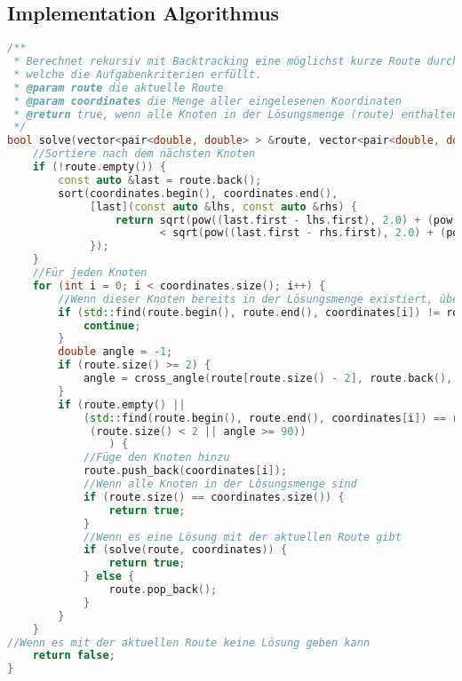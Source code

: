 \documentclass[a4paper,10pt,ngerman]{scrartcl}
\begin{document}
    \newpage
    \subsection{Implementation Algorithmus}\label{subsec:implementation-algorithmus}
    \begin{lstlisting}[frame=single,language=C++,title=Methode solve,breaklines=true,label={lst:code_solve}]
/**
 * Berechnet rekursiv mit Backtracking eine möglichst kurze Route durch den Graphen,
 * welche die Aufgabenkriterien erfüllt.
 * @param route die aktuelle Route
 * @param coordinates die Menge aller eingelesenen Koordinaten
 * @return true, wenn alle Knoten in der Lösungsmenge (route) enthalten sind, andernfalls false
 */
bool solve(vector<pair<double, double> > &route, vector<pair<double, double> > &coordinates) {
    //Sortiere nach dem nächsten Knoten
    if (!route.empty()) {
        const auto &last = route.back();
        sort(coordinates.begin(), coordinates.end(),
             [last](const auto &lhs, const auto &rhs) {
                 return sqrt(pow((last.first - lhs.first), 2.0) + (pow((last.second - lhs.second), 2.0)))
                        < sqrt(pow((last.first - rhs.first), 2.0) + (pow((last.second - rhs.second), 2.0)));
             });
    }
    //Für jeden Knoten
    for (int i = 0; i < coordinates.size(); i++) {
        //Wenn dieser Knoten bereits in der Lösungsmenge existiert, überspringe diesen
        if (std::find(route.begin(), route.end(), coordinates[i]) != route.end()) {
            continue;
        }
        double angle = -1;
        if (route.size() >= 2) {
            angle = cross_angle(route[route.size() - 2], route.back(), coordinates[i]);
        }
        if (route.empty() ||
            (std::find(route.begin(), route.end(), coordinates[i]) == route.end() &&
             (route.size() < 2 || angle >= 90))
                ) {
            //Füge den Knoten hinzu
            route.push_back(coordinates[i]);
            //Wenn alle Knoten in der Lösungsmenge sind
            if (route.size() == coordinates.size()) {
                return true;
            }
            //Wenn es eine Lösung mit der aktuellen Route gibt
            if (solve(route, coordinates)) {
                return true;
            } else {
                route.pop_back();
            }
        }
    }
//Wenn es mit der aktuellen Route keine Lösung geben kann
    return false;
}
    \end{lstlisting}

    \newpage
\end{document}
